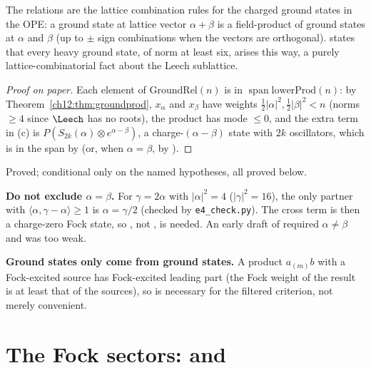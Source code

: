 \begin{physics}
The relations are the lattice combination rules for the charged ground states in the OPE: a ground state at lattice vector $\alpha+\beta$ is a field-product of ground states at $\alpha$ and $\beta$ (up to $\pm$ sign combinations when the vectors are orthogonal).  states that every heavy ground state, of norm at least six, arises this way, a purely lattice-combinatorial fact about the Leech sublattice.
\end{physics}
\begin{proof}[Proof on paper]
Each element of $\mathrm{GroundRel}(n)$ is in $\operatorname{span}\mathrm{lowerProd}(n)$: by
Theorem~\ref{ch12:thm:groundprod}, $x_\alpha$ and $x_\beta$ have weights $\tfrac12|\alpha|^2,\tfrac12|\beta|^2<n$
(norms $\ge4$ since $\Leech$ has no roots), the product has mode $\le0$, and the extra term in (c) is
$P(S_{2k}(\alpha)\otimes e^{\alpha-\beta})$, a charge-$(\alpha-\beta)$ state with $2k$ oscillators, which is
in the span by  (or, when $\alpha=\beta$, by ).
\end{proof}
\begin{status}Proved; conditional only on the named hypotheses, all proved below.\end{status}

\begin{warning}
\textbf{Do not exclude $\alpha=\beta$.}  For $\gamma=2\alpha$ with $|\alpha|^2=4$ ($|\gamma|^2=16$), the only
partner with $\langle\alpha,\gamma-\alpha\rangle\ge1$ is $\alpha=\gamma/2$ (checked by
\texttt{e4\_check.py}).  The cross term is then a charge-zero Fock state, so , not
, is needed.  An early draft of  required $\alpha\neq\beta$ and was
too weak.

\textbf{Ground states only come from ground states.}  A product $a_{(m)}b$ with a Fock-excited source
has Fock-excited leading part (the Fock weight of the result is at least that of the sources), so
 is necessary for the filtered criterion, not merely convenient.
\end{warning}

\section{The Fock sectors: \texorpdfstring{}{ExcitedSpanned} and \texorpdfstring{}{FockSpanned}}\label{ch12:sec:fock}

